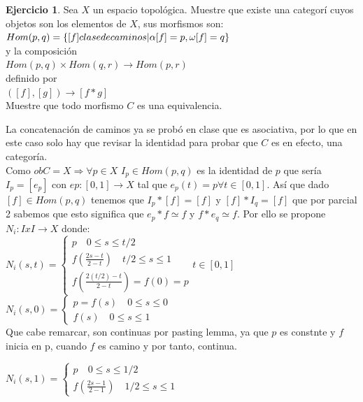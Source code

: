 \documentclass[11pt,a4paper,oneside]{report}
\theoremstyle{definition}
\newtheorem{ejercicio}[definicion]{Ejercicio}
\theoremstyle{plain}
\theoremstyle{remark}
\DeclarePairedDelimiter{\conj}{\{}{\}}
\begin{document}
\begin{ejercicio}
  Sea $X$ un espacio topológica. Muestre que existe una categorí cuyos objetos son los elementos de $X$, sus morfismos son: \\
  $Hom(p,q)=\conj{[f] clase de caminos | \alpha [f]=p, \omega[f]=q}$\\ 
  y la composición \\
  $Hom(p,q)\times Hom(q,r) \rightarrow Hom(p,r)$\\
  definido por\\
  $([f],[g])\rightarrow [f*g]$\\
  Muestre que todo morfismo $C$ es una equivalencia.
\end{ejercicio}
La concatenación de caminos ya se probó en clase que es asociativa, por lo que en este caso solo hay que revisar 
la identidad para probar que $C$ es en efecto, una categoría.\\
Como $obC=X \Rightarrow \forall p \in X$ $I_p \in Hom(p,q)$ es la identidad de $p$ que sería $I_p=[e_p]$ con 
$ep:[0,1] \rightarrow X$ tal que $e_p(t)=p \forall t \in [0,1]$. Así que dado $[f]\in Hom(p,q)$ tenemos que 
$I_p*[f]=[f]$ y $[f]*I_q=[f]$ que por parcial 2 sabemos que esto significa que $e_p*f\simeq f$ y $f*e_q\simeq f$. 
Por ello se propone $N_i:IxI\rightarrow X$ donde:\\
$N_i(s,t) = \left\{
  \begin{array}{l}
    p \quad 0\leq s \leq t/2 \\
    f(\frac{2s-t}{2-t}) \quad t/2 \leq s \leq 1 \\
    f(\frac{2(t/2)-t}{2-t})=f(0)=p
  \end{array}
  t \in [0,1]
\right.$\\

$N_i(s,0) = \left\{
  \begin{array}{l}
    p=f(s) \quad 0\leq s \leq 0  \\
    f(s) \quad 0 \leq s \leq 1 
  \end{array}
\right.$\\

Que cabe remarcar, son continuas por pasting lemma, ya que $p$ es constnte y $f$ inicia en p, cuando $f$ es camino 
y por tanto, continua.

$N_i(s,1) = \left\{
  \begin{array}{l}
    p \quad 0\leq s \leq 1/2  \\
    f(\frac{2s-1}{2-1}) \quad 1/2 \leq s \leq 1 
  \end{array}
\right.$\\
\end{document}
